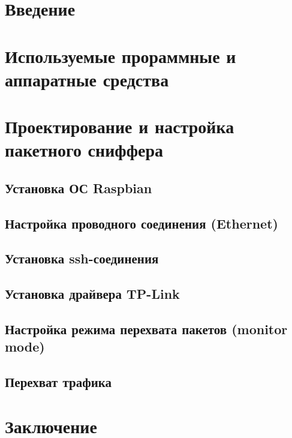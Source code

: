 






\newpage
{}
\tableofcontents

\newpage
{}
\setcounter{section}{0}
\section*{Введение}


\newpage
{}
\section{Используемые прораммные и аппаратные средства}
\setcounter{figure}{0}


\newpage
{}
\section{Проектирование и настройка пакетного сниффера}
\setcounter{figure}{0}
\subsection{Установка ОС Raspbian}

\subsection{Настройка проводного соединения (Ethernet)}

\subsection{Установка ssh-соединения}

\subsection{Установка драйвера TP-Link}

\subsection{Настройка режима перехвата пакетов (monitor mode)}

\subsection{Перехват трафика}


\newpage
{}
\setcounter{section}{0}
\section*{Заключение}



\clearpage
\renewcommand{\refname}{Список использованных источников}



